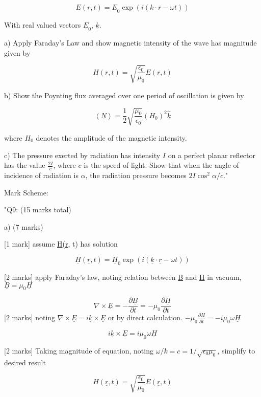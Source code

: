 \[ \underline{E}(\underline{r}, t) = \underline{E}_{0} \exp (i(\underline{k} \cdot \underline{r} - \omega t)) \]

With real valued vectors \( \underline{E}_{0} \), \( \underline{k} \).

a) Apply Faraday’s Law and show magnetic intensity of the wave has magnitude given by 

\[ H(\underline{r}, t) = \sqrt{\frac{\epsilon_{0}}{\mu_{0}}} E(\underline{r}, t) \]

b) Show the Poynting flux averaged over one period of oscillation is given by 

\[ \left< \underline{N} \right> = \frac{1}{2} \sqrt{\frac{\mu_{0}}{\epsilon_{0}}} (H_{0})^{2} \hat{\underline{k}} \]

where \( H_{0} \) denotes the amplitude of the magnetic intensity.
    
c) The pressure exerted by radiation has intensity \( I \) on a perfect planar reflector has the value \( \frac{2I}{c} \), where \( c \) is the speed of light. Show that when the angle of incidence of radiation is \( \alpha \), the radiation pressure becomes \( 2I\cos^{2}{\alpha}/{c} \)."

Mark Scheme:

"{Q9: (15 marks total)}

a) (7 marks)

[1 mark] assume \underline{H}(\underline{r}, t) has solution

\[ \underline{H}(\underline{r}, t) = \underline{H}_0 \exp (i(\underline{k} \cdot \underline{r} - \omega t)) \]

[2 marks] apply Faraday's law, noting relation between \underline{B} and \underline{H} in vacuum, \( \underline{B} = \mu_0 \underline{H} \)

\[ \nabla \times \underline{E} = - \frac{\partial \underline{B}}{\partial t} = - \mu_0 \frac{\partial \underline{H}}{\partial t}  \]
[2 marks] noting \( \nabla \times \underline{E} = i \underline{k} \times \underline{E} \) or by direct calculation. \( - \mu_0 \frac{\partial \underline{H}}{\partial t} = - i \mu_0 \omega \underline{H} \)

\[ i \underline{k} \times \underline{E} = i \mu_0 \omega \underline{H} \]

[2 marks] Taking magnitude of equation, noting \( \omega / k = c = 1 / \sqrt{\epsilon_0 \mu_0} \), simplify to desired result 

\[ H(\underline{r}, t) = \sqrt{\frac{\epsilon_{0}}{\mu_{0}}} E(\underline{r}, t) \]

